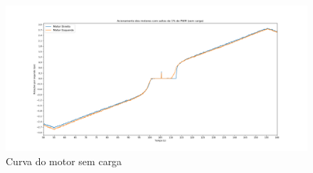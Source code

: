\begin{figure}[!ht]
\centering
\caption{Curva do motor sem carga}
		\centering
		\includegraphics[trim={5cm 1cm 5cm 2cm},clip,
scale=0.25]{Figuras/Acionamento_Sem_Carga_rps}
\end{figure}